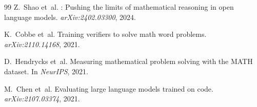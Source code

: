 \documentclass[11pt]{article}
\begin{document}
\begin{thebibliography}{99}
Z.~Shao et~al.
: Pushing the limits of mathematical reasoning in open language models.
\newblock \emph{arXiv:2402.03300}, 2024.

K.~Cobbe et~al.
\newblock Training verifiers to solve math word problems.
\newblock \emph{arXiv:2110.14168}, 2021.

D.~Hendrycks et~al.
\newblock Measuring mathematical problem solving with the {MATH} dataset.
\newblock In \emph{NeurIPS}, 2021.

M.~Chen et~al.
\newblock Evaluating large language models trained on code.
\newblock \emph{arXiv:2107.03374}, 2021.

\end{thebibliography}
\end{document}
